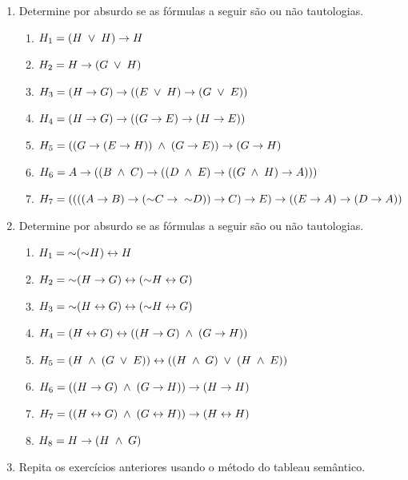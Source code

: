 \begin{enumerate}
  \item Determine por absurdo se as fórmulas a seguir são ou não tautologias.
    \begin{enumerate}
      \item $H_1 = (H \;\lor\;  H) \rightarrow H$
      \item $H_2 =  H \rightarrow (G \;\lor\; H)$
      \item $H_3 = (H \rightarrow G) \rightarrow ( (E \;\lor\;  H) \rightarrow (G \;\lor\;  E) )$
      \item $H_4 = (H \rightarrow G) \rightarrow ( (G \rightarrow E) \rightarrow (H \rightarrow E) )$
      \item $H_5 = ( (G \rightarrow (E \rightarrow H)) \;\land\; (G \rightarrow E) ) \rightarrow (G \rightarrow H)$
      \item $H_6 = A \rightarrow ((B \;\land\; C) \rightarrow ((D \;\land\; E) \rightarrow ((G \;\land\; H) \rightarrow A )))$
      \item $H_7 = ((((A \rightarrow B) \rightarrow (\mathord{\sim} C \rightarrow \; \mathord{\sim} D)) \rightarrow C) \rightarrow E) \rightarrow \\ ((E \rightarrow A) \rightarrow (D \rightarrow A))$
    \end{enumerate}
  \item Determine por absurdo se as fórmulas a seguir são ou não tautologias.
    \begin{enumerate}
      \item $H_1 = \mathord{\sim}(\mathord{\sim} H) \leftrightarrow H$
      \item $H_2 = \mathord{\sim}(H \rightarrow G) \leftrightarrow (\mathord{\sim} H \leftrightarrow G)$
      \item $H_3 = \mathord{\sim}(H \leftrightarrow G) \leftrightarrow (\mathord{\sim} H \leftrightarrow G)$
      \item $H_4 = (H \leftrightarrow G) \leftrightarrow ((H \rightarrow G) \;\land\; (G \rightarrow H))$
      \item $H_5 = (H \;\land\; (G \;\lor\; E)) \leftrightarrow ((H \;\land\; G) \;\lor\; (H \;\land\; E))$
      \item $H_6 = ( (H \rightarrow G) \;\land\; (G \rightarrow H) ) \rightarrow (H \rightarrow H)$
      \item $H_7 = ( (H \leftrightarrow G) \;\land\; (G \leftrightarrow H) ) \rightarrow (H \leftrightarrow H)$
      \item $H_8 = H \rightarrow (H \;\land\; G)$
    \end{enumerate}
  \item Repita os exercícios anteriores usando o método do tableau semântico.
\end{enumerate}
